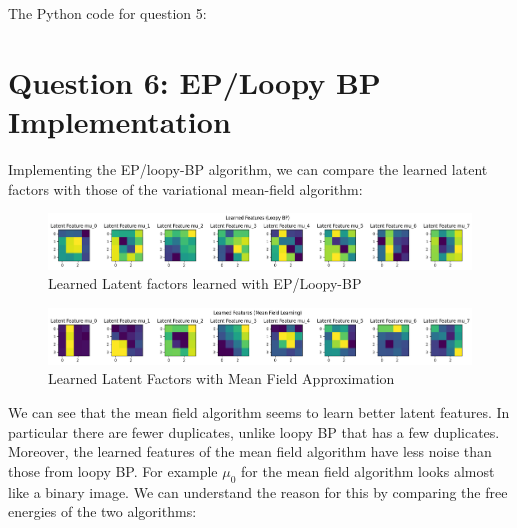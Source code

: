 \documentclass[12pt]{article}
\begin{document}
\newpage
The Python code for question 5:



\newpage
\section*{Question 6: EP/Loopy BP Implementation}

Implementing the EP/loopy-BP algorithm, we can compare the learned latent factors with those of the variational mean-field algorithm:

\begin{figure}[h]
\centering
\includegraphics[scale=0.4]{outputs/q6/all-latent-factors}
\caption{Learned Latent factors learned with EP/Loopy-BP}
\label{fig:6-latent-factors}
\end{figure}

\begin{figure}[h]
\centering
\includegraphics[scale=0.4]{outputs/q3/f-latent-factors}
\caption{Learned Latent Factors with Mean Field Approximation}
\label{fig:3f-latent-factors}
\end{figure}

We can see that the mean field algorithm seems to learn better latent features. In particular there are fewer duplicates, unlike loopy BP that has a few duplicates. Moreover, the learned features of the mean field algorithm have less noise than those from loopy BP. For example $\mu_0$ for the mean field algorithm looks almost like a binary image. We can understand the reason for this by comparing the free energies of the two algorithms:
\end{document}
